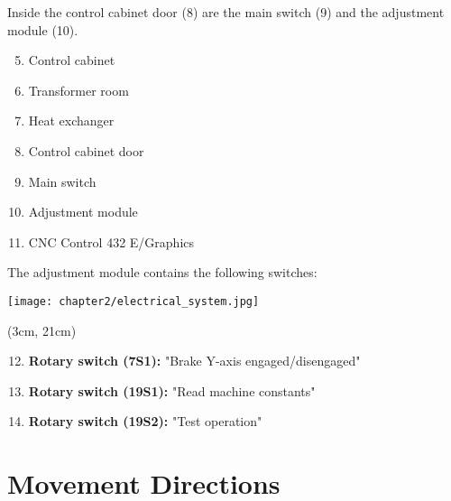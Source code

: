 \vspace{0.3cm}
\noindent Inside the control cabinet door (8) are the main switch (9) and the adjustment module (10).

\begin{minipage}[c]{0.45\textwidth}
    \begin{enumerate}[itemsep=1pt,parsep=0pt]
        \setcounter{enumi}{4}
        \item Control cabinet
        \item Transformer room
        \item Heat exchanger
        \item Control cabinet door
        \item Main switch
        \item Adjustment module
        \item CNC Control 432 E/Graphics
    \end{enumerate}

    \noindent The adjustment module contains the following switches:
\end{minipage}%
\begin{minipage}{0.6\textwidth}
    \centering
    \texttt{[image: chapter2/electrical\_system.jpg]}
    \label{fig:electrical_system}
\end{minipage}

\begin{textblock*}{\textwidth}(3cm, 21cm)  %
    \begin{enumerate}[itemsep=1pt,parsep=0pt]
        \setcounter{enumi}{11}
        \item \textbf{Rotary switch (7S1):} "Brake Y-axis engaged/disengaged"
        \item \textbf{Rotary switch (19S1):} "Read machine constants"
        \item \textbf{Rotary switch (19S2):} "Test operation"
    \end{enumerate}
\end{textblock*}

\vspace{2cm}


\section{Movement Directions}


